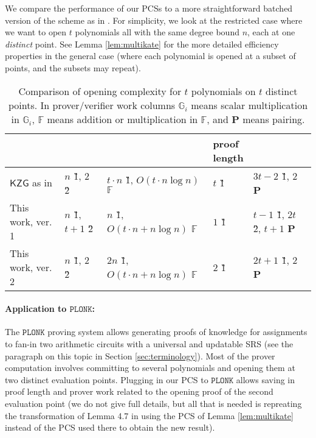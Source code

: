 \documentclass[11pt]{article} %
\newcommand{\Gi}{\ensuremath{{\mathbb G}_i}\xspace}
\newcommand{\F}{\ensuremath{\mathbb F}\xspace}
\newcommand{\kate}{\ensuremath{\mathsf{KZG}}\xspace}
\newcommand{\plonk}{\ensuremath{\mathtt{PLONK}}\xspace}
\begin{document}
We compare the performance of our PCSs to a more straightforward batched version of the \cite{kate} scheme as in \cite{plonk}.
For simplicity, we look at the restricted case where we want to open $t$ polynomials all with the same degree bound $n$, each at one \emph{distinct} point. See Lemma \ref{lem:multikate} for the more detailed efficiency properties in the general case (where each polynomial is opened at a subset of points, and the subsets may repeat).
\begin{table}[!htbp]
	\caption{Comparison of opening complexity for $t$ polynomials on $t$ distinct points. In prover/verifier work columns \Gi means scalar multiplication in \Gi, \F means addition or multiplication in \F, and \textbf{P} means pairing. }
	\centering
\begin{adjustbox}{width=1\textwidth}
	\begin{tabular}{l|l|l|l|l}
	& \thead{SRS size} & \thead{prover work} & \thead{proof\\ length} & \thead{verifier work} \\ \hline
		\kate as in \cite{plonk}
		         & $n$ \G1, $2$ \G2  & $t\cdot n$ \G1, $O(t\cdot n\log n)$ \F &   $t$ \G1 &  $3t-2$ \G1, $2$ \textbf{P}\\ \hline
		This work, ver. 1     & $n$ \G1, $t+1$ \G2 &   $n$ \G1, $O(t\cdot n + n\log n)$ \F  & $1$ \G1 & $t-1$ \G1, $2t$ \G2, $t+1$ \textbf{P}   \\ \hline
	This work, ver. 2     & $n$ \G1, $2$ \G2 &   $2n$ \G1, $O(t\cdot n + n\log n)$ \F  & $2$ \G1 & $2t+1$ \G1, $2$ \textbf{P}   \\ \hline

	\end{tabular}
\end{adjustbox}
\label{table:prover-work}
\end{table}



\paragraph{Application to \plonk:}


The \plonk proving system \cite{plonk}  allows generating proofs of knowledge for assignments
to fan-in two arithmetic circuits with a universal and updatable SRS (see the paragraph on this topic in Section \ref{sec:terminology}). Most of the prover computation involves committing to several polynomials and opening them at two distinct evaluation points. Plugging in our PCS to \plonk allows saving in proof length and prover work related to the opening proof of the second evaluation point (we do not give full details, but all that is needed is repreating the transformation of Lemma 4.7 in \cite{plonk} using the PCS of Lemma \ref{lem:multikate} instead of the PCS used there to obtain the new result).
\end{document}
